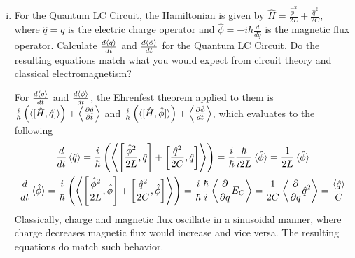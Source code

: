\documentclass[10pt,letterpaper]{article}
\begin{document}
\begin{enumerate}
\begin{enumerate}[a)]
\begin{enumerate}[i)]
\color{violet}
Using the given generalized Ehrenfest theorem, $\frac{d\braket{x}}{dt}$ and $\frac{d\braket{{p}}}{dt}$ could be prepared and calculated in the following manners
\begin{gather*}
\frac{d}{dt}\braket{x} = \frac{i}{\hbar}\left( \braket{[\hat{H}, \hat{x}]} \right) + \left\langle \frac{\partial \hat{x}}{\partial t} \right\rangle = \frac{i}{\hbar} \left( \left\langle \left[\frac{\hat{p}^{2}}{2m}, \hat{x}\right] \right\rangle \right) = \frac{i}{\hbar} \frac{\hbar}{im} \braket{\hat{p}} = \frac{1}{m}\braket{\hat{p}} \\
\frac{d}{dt} \braket{p} = \frac{i}{\hbar} \left( \left\langle \left[ \frac{\hat{p}^{2}}{2m}, \hat{p} \right] \right\rangle \right) + \left\langle \frac{\partial \hat{p}}{\partial t} \right\rangle = 0
\end{gather*}
The results do match the expectation for a free particle, since $\frac{d}{dt} \braket{x}$ is $\braket{p}$ classically and $\frac{d}{dt}\braket{p}$ is $-\braket{V'(x)}$. 
\color{black}

\item For the Quantum LC Circuit, the Hamiltonian is given by $\hat{H} = \frac{\hat{\phi}^{2}}{2L} + \frac{\hat{q}^{2}}{2C}$, where $\hat{q} = q$ is the electric charge operator and $\hat{\phi} = -i\hbar\frac{d}{d\hat{q}}$ is the magnetic flux operator. Calculate $\frac{d\braket{q}}{dt}$ and $\frac{d\braket{\phi}}{dt}$ for the Quantum LC Circuit. Do the resulting equations match what you would expect from circuit theory and classical electromagnetism?

\color{violet}
For $\frac{d\braket{q}}{dt}$ and $\frac{d\braket{\phi}}{dt}$, the Ehrenfest theorem applied to them is $\frac{i}{\hbar} \left( \braket{[\hat{H}, \hat{q}]} \right) + \left\langle \frac{\partial \hat{q}}{\partial t} \right\rangle$ and $\frac{i}{\hbar} \left( \braket{[\hat{H}, \hat{\phi}]} \right) + \left\langle \frac{\partial \hat{\phi}}{dt} \right\rangle$, which evaluates to the following
\begin{gather*}
\frac{d}{dt} \braket{\hat{q}} = \frac{i}{\hbar} \left( \left\langle\left[ \frac{\hat{\phi}^{2}}{2L}, \hat{q} \right] + \left[ \frac{\hat{q}^{2}}{2C}, \hat{q} \right]\right\rangle\right) = \frac{i}{\hbar} \frac{\hbar}{i2L} \braket{\hat{\phi}} = \frac{1}{2L}\braket{\hat{\phi}} \\
\frac{d}{dt} \braket{\hat{\phi}} = \frac{i}{\hbar} \left( \left\langle\left[ \frac{\hat{\phi}^{2}}{2L}, \hat{\phi} \right] + \left[ \frac{\hat{q}^{2}}{2C}, \hat{\phi} \right]\right\rangle\right) = \frac{i}{\hbar} \frac{\hbar}{i} \left\langle \frac{\partial}{\partial q} E_{C} \right\rangle = \frac{1}{2C} \left\langle \frac{\partial}{\partial q} \hat{q}^{2} \right\rangle = \frac{\braket{\hat{q}}}{C}
\end{gather*}
Classically, charge and magnetic flux oscillate in a sinusoidal manner, where charge decreases magnetic flux would increase and vice versa. The resulting equations do match such behavior.
\color{black}


\end{enumerate}
\end{enumerate}
\end{enumerate}
\end{document}

